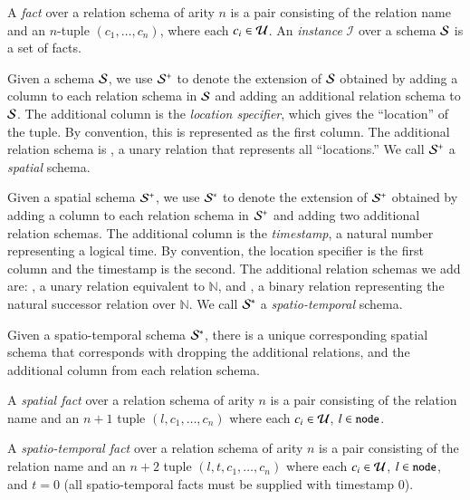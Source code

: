 
A {\em fact} over a relation schema of arity $n$ is a pair consisting of the
relation name and an $n$-tuple $(c_1,\ldots,c_n)$, where each $c_i \in
\univ$.  An \emph{instance} $\mathcal{I}$ over a schema $\schema$ is a
set of facts. 

  Given a schema $\schema$, we use
$\sschema$ to denote the extension of $\schema$ obtained by adding a
column to each relation schema in $\schema$ and adding an additional
relation schema to $\schema$.  The additional column is the {\em location
  specifier}, which gives the ``location'' of the tuple.  By convention, this is
represented as the first column.  The additional relation schema is , a
unary relation that represents all ``locations.''  We call $\sschema$ a
{\em spatial} schema.


Given a spatial schema $\sschema$, we use $\stschema$ to denote the
extension of $\sschema$ obtained by adding a column to each relation schema
in $\sschema$ and adding two additional relation schemas.  The additional
column is the {\em timestamp}, a natural number representing a logical time.  By
convention, the location specifier is the first column and the timestamp is the
second.  The additional relation schemas we add are: , a unary
relation equivalent to $\mathbb{N}$, and , a binary relation
representing the natural successor relation over $\mathbb{N}$.  We call
$\stschema$ a {\em spatio-temporal} schema.

Given a spatio-temporal schema $\stschema$, there is a unique corresponding spatial schema that corresponds with dropping the additional relations, and the additional column from each relation schema.

A {\em spatial fact} over a relation schema of arity $n$ is a pair consisting of the relation name and an $n+1$ tuple $(l,c_1,\ldots,c_n)$ where each $c_i \in \univ$, $l \in \dedalus{node}$.

A {\em spatio-temporal fact} over a relation schema of arity $n$ is a pair consisting of the relation name and an $n+2$ tuple $(l,t,c_1,\ldots,c_n)$ where each $c_i \in \univ$, $l \in \dedalus{node}$, and $t = 0$ (all spatio-temporal facts must be supplied with timestamp 0).

